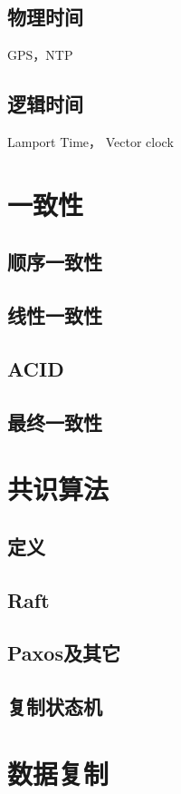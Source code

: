 \documentclass[reqno,heading=true,fontset=macnew]{ctexbook}
\begin{document}
\section{物理时间}

GPS，NTP

\section{逻辑时间}
Lamport Time， Vector clock

\chapter{一致性}
\section{顺序一致性}

\section{线性一致性}
\section{ACID}

\section{最终一致性}


\chapter{共识算法}
\section{定义}

\section{Raft}
\section{Paxos及其它}

\section{复制状态机}


\chapter{数据复制}
\end{document}
